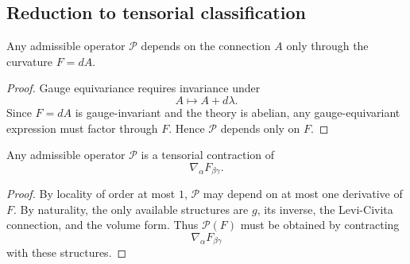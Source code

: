 \subsection{Reduction to tensorial classification}
\begin{lemma}
	\label{lem:em-operator-gauge-reduction}
	Any admissible operator $\mathcal P$ depends on the connection $A$
	only through the curvature $F=dA$.
\end{lemma}
\begin{proof}
	Gauge equivariance requires invariance under
	\[
		A \mapsto A + d\lambda.
	\]
	Since $F=dA$ is gauge-invariant and the theory is abelian, any
	gauge-equivariant expression must factor through $F$.
	Hence $\mathcal P$ depends only on $F$.
\end{proof}
\begin{lemma}
	\label{lem:em-operator-first-order}
	Any admissible operator $\mathcal P$ is a tensorial contraction of
	\[
		\nabla_\alpha F_{\beta\gamma}.
	\]
\end{lemma}
\begin{proof}
	By locality of order at most $1$, $\mathcal P$ may depend on at most
	one derivative of $F$.
	By naturality, the only available structures are $g$, its inverse,
	the Levi-Civita connection, and the volume form.
	Thus $\mathcal P(F)$ must be obtained by contracting
	\[
		\nabla_\alpha F_{\beta\gamma}
	\]
	with these structures.
\end{proof}
